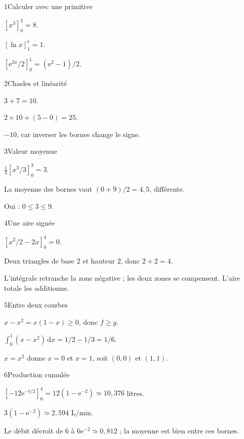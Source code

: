 \begin{corrige}{1}{Calculer avec une primitive}
\begin{questions}
\item $[x^3]_0^2=8$.
\item $[\ln x]_1^{\mathrm e}=1$.
\item $[\mathrm e^{2x}/2]_0^1=(\mathrm e^2-1)/2$.
\end{questions}
\end{corrige}
\begin{corrige}{2}{Chasles et linéarité}
\begin{questions}
\item $3+7=10$.
\item $2\times10+(5-0)=25$.
\item $-10$, car inverser les bornes change le signe.
\end{questions}
\end{corrige}
\begin{corrige}{3}{Valeur moyenne}
\begin{questions}
\item $\frac13[x^3/3]_0^3=3$.
\item La moyenne des bornes vaut $(0+9)/2=4{,}5$, différente.
\item Oui : $0\leq3\leq9$.
\end{questions}
\end{corrige}
\begin{corrige}{4}{Une aire signée}
\begin{questions}
\item $[x^2/2-2x]_0^4=0$.
\item Deux triangles de base $2$ et hauteur $2$, donc $2+2=4$.
\item L’intégrale retranche la zone négative ; les deux zones se compensent. L’aire totale les additionne.
\end{questions}
\end{corrige}
\begin{corrige}{5}{Entre deux courbes}
\begin{questions}
\item $x-x^2=x(1-x)\geq0$, donc $f\geq g$.
\item $\int_0^1(x-x^2)\,\mathrm dx=1/2-1/3=1/6$.
\item $x=x^2$ donne $x=0$ et $x=1$, soit $(0,0)$ et $(1,1)$.
\end{questions}
\end{corrige}
\begin{corrige}{6}{Production cumulée}
\begin{questions}
\item $[-12\mathrm e^{-t/2}]_0^4=12(1-\mathrm e^{-2})\simeq10{,}376$ litres.
\item $3(1-\mathrm e^{-2})\simeq2{,}594$ L/min.
\item Le débit décroît de $6$ à $6\mathrm e^{-2}\simeq0{,}812$ ; la moyenne est bien entre ces bornes.
\end{questions}
\end{corrige}

